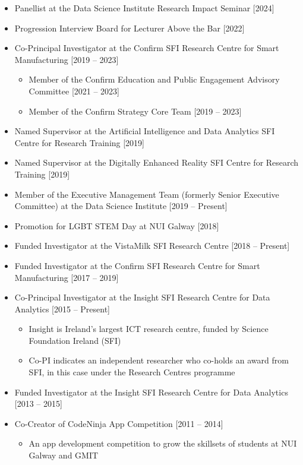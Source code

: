 \documentclass[10pt,a4paper]{res} %
\begin{document}
\begin{resume}
\begin{itemize} \itemsep -2pt
\item Panellist at the Data Science Institute Research Impact Seminar [2024]
\item Progression Interview Board for Lecturer Above the Bar [2022]
\item Co-Principal Investigator at the Confirm SFI Research Centre for Smart Manufacturing [2019 -- 2023]
\begin{itemize} \itemsep -2pt
\item Member of the Confirm Education and Public Engagement Advisory Committee [2021 -- 2023]
\item Member of the Confirm Strategy Core Team [2019 -- 2023]
\end{itemize}
\item Named Supervisor at the Artificial Intelligence and Data Analytics SFI Centre for Research Training [2019]
\item Named Supervisor at the Digitally Enhanced Reality SFI Centre for Research Training [2019]
\item Member of the Executive Management Team (formerly Senior Executive Committee) at the Data Science Institute [2019 -- Present]
\item Promotion for LGBT STEM Day at NUI Galway [2018]
\item Funded Investigator at the VistaMilk SFI Research Centre [2018 -- Present]
\item Funded Investigator at the Confirm SFI Research Centre for Smart Manufacturing [2017 -- 2019]
\item Co-Principal Investigator at the Insight SFI Research Centre for Data Analytics [2015 -- Present]
\begin{itemize} \itemsep -2pt
\item Insight is Ireland's largest ICT research centre, funded by Science Foundation Ireland (SFI)
\item Co-PI indicates an independent researcher who co-holds an award from SFI, in this case under the Research Centres programme
\end{itemize}
\item Funded Investigator at the Insight SFI Research Centre for Data Analytics [2013 -- 2015]
\item Co-Creator of CodeNinja App Competition [2011 -- 2014]
\begin{itemize} \itemsep -2pt
\item An app development competition to grow the skillsets of students at NUI Galway and GMIT

\end{itemize}
\end{itemize}
\end{resume}
\end{document}
